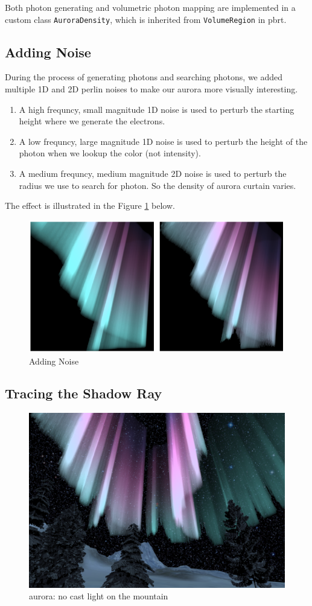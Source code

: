 \documentclass[10pt,a4paper]{article}
\begin{document}
Both photon generating and volumetric photon mapping are implemented in a custom class \texttt{AuroraDensity}, which is inherited from \texttt{VolumeRegion} in pbrt.

\subsection{Adding Noise}

During the process of generating photons and searching photons, we added 
multiple 1D and 2D perlin noises to make our aurora more visually interesting.

\begin{enumerate}
    \item A high frequncy, small magnitude 1D noise is used to perturb 
    the starting height where we generate the electrons.
    \item A low frequncy, large magnitude 1D noise is used to perturb 
    the height of the photon when we lookup the color (not intensity).
    \item A medium frequncy, medium magnitude 2D noise is used to 
    perturb the radius we use to search for photon. So the density of 
    aurora curtain varies. 
\end{enumerate}

The effect is illustrated in the Figure \ref{fig:noise} below.
\begin{figure}[h]
\centering
\includegraphics[width=0.8\linewidth]{./noise}
\caption{Adding Noise}
\label{fig:noise}
\end{figure}

\subsection{Tracing the Shadow Ray}

\begin{figure}[h]
\centering
\includegraphics[width=0.7\linewidth]{./no_light_cast}
\caption{aurora: no cast light on the mountain}
\label{fig:no_light_cast}
\end{figure}
\end{document}
